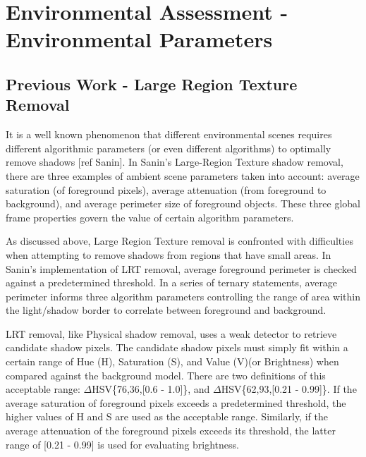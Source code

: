 \documentclass[12pt]{report}
\begin{document}
\section{Environmental Assessment - Environmental Parameters}

\subsection{Previous Work - Large Region Texture Removal}

It is a well known phenomenon that different environmental scenes requires different algorithmic parameters (or even different algorithms) to optimally remove shadows [ref Sanin]. In Sanin's Large-Region Texture shadow removal, there are three examples of ambient scene parameters taken into account: average saturation (of foreground pixels), average attenuation (from foreground to background), and average perimeter size of foreground objects. These three global frame properties govern the value of certain algorithm parameters.

As discussed above, Large Region Texture removal is confronted with difficulties when attempting to remove shadows from regions that have small areas. In Sanin's implementation of LRT removal, average foreground perimeter is checked against a predetermined threshold. In a series of ternary statements, average perimeter informs three algorithm parameters controlling the range of area within the light/shadow border to correlate between foreground and background.

LRT removal, like Physical shadow removal, uses a weak detector to retrieve candidate shadow pixels. The candidate shadow pixels must simply fit within a certain range of Hue (H), Saturation (S), and Value (V)(or Brightness) when compared against the background model. There are two definitions of this acceptable range: $\Delta$HSV\{76,36,[0.6 - 1.0]\}, and $\Delta$HSV\{62,93,[0.21 - 0.99]\}. If the average saturation of foreground pixels exceeds a predetermined threshold, the higher values of H and S are used as the acceptable range. Similarly, if the average attenuation of the foreground pixels exceeds its threshold, the latter range of [0.21 - 0.99] is used for evaluating brightness. 
\end{document}
